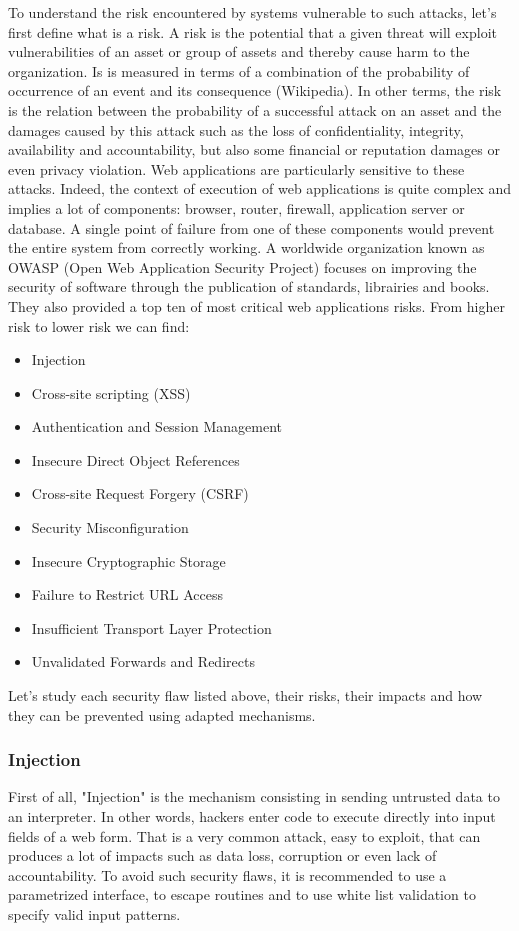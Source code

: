 To understand the risk encountered by systems vulnerable to such attacks,
let's first define what is a risk. A risk is the potential that a given threat
will exploit vulnerabilities of an asset or group of assets and thereby cause
harm to the organization. Is is measured in terms of a combination of the
probability of occurrence of an event and its consequence (Wikipedia). In
other terms, the risk is the relation between the probability of a successful
attack on an asset and the damages caused by this attack such as the loss of
confidentiality, integrity, availability and accountability, but also some
financial or reputation damages or even privacy violation.
Web applications are particularly sensitive to these attacks. Indeed, the
context of execution of web applications is quite complex and implies a lot of
components: browser, router, firewall, application server or database. A
single point of failure from one of these components would prevent the entire
system from correctly working. A worldwide organization known as OWASP (Open
Web Application Security Project) focuses on improving the security of
software through the publication of standards, librairies and books. They also
provided a top ten of most critical web applications risks. From higher risk
to lower risk we can find:
\begin{itemize}{}
\item Injection
\item Cross-site scripting (XSS)
\item Authentication and Session Management
\item Insecure Direct Object References
\item Cross-site Request Forgery (CSRF)
\item Security Misconfiguration
\item Insecure Cryptographic Storage
\item Failure to Restrict URL Access
\item Insufficient Transport Layer Protection
\item Unvalidated Forwards and Redirects
\end{itemize}

Let's study each security flaw listed above, their risks, their impacts and
how they can be prevented using adapted mechanisms.

\subsubsection{Injection}
First of all, "Injection" is the mechanism consisting in sending untrusted
data to an interpreter. In other words, hackers enter code to execute directly
into input fields of a web form. That is a very common attack, easy to
exploit, that can produces a lot of impacts such as data loss, corruption or
even lack of accountability. To avoid such security flaws, it is recommended
to use a parametrized interface, to escape routines and to use white list
validation to specify valid input patterns.

